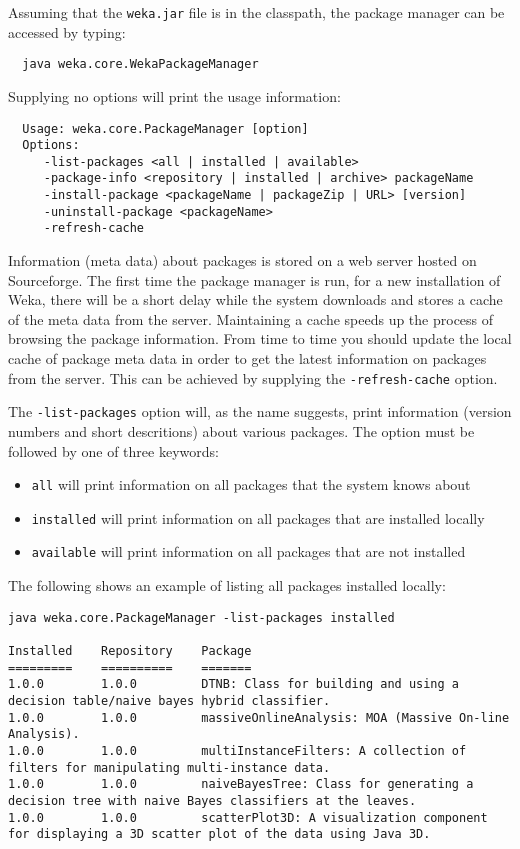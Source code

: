 Assuming that the \texttt{weka.jar} file is in the classpath, the
package manager can be accessed by typing:

{\scriptsize
\begin{verbatim}
  java weka.core.WekaPackageManager
\end{verbatim}}

Supplying no options will print the usage information:

{\scriptsize
\begin{verbatim}
  Usage: weka.core.PackageManager [option]
  Options:
     -list-packages <all | installed | available>
     -package-info <repository | installed | archive> packageName
     -install-package <packageName | packageZip | URL> [version]
     -uninstall-package <packageName>
     -refresh-cache
\end{verbatim}}

Information (meta data) about packages is stored on a web server
hosted on Sourceforge. The first time the package manager is run, for
a new installation of Weka, there will be a short delay while the
system downloads and stores a cache of the meta data from the
server. Maintaining a cache speeds up the process of browsing
the package information. From time to time you should update the
local cache of package meta data in order to get the latest information
on packages from the server. This can be achieved by supplying the
\texttt{-refresh-cache} option.

The \texttt{-list-packages} option will, as the name suggests, print
information (version numbers and short descritions) about various
packages. The option must be followed by one of three keywords:

\begin{itemize}
\item \texttt{all} will print information on all packages that the system knows about
\item \texttt{installed} will print information on all packages that are installed locally
\item \texttt{available} will print information on all packages that are not installed
\end{itemize}

The following shows an example of listing all packages installed locally:

{\scriptsize
\begin{verbatim}
java weka.core.PackageManager -list-packages installed

Installed    Repository    Package
=========    ==========    =======
1.0.0        1.0.0         DTNB: Class for building and using a decision table/naive bayes hybrid classifier.
1.0.0        1.0.0         massiveOnlineAnalysis: MOA (Massive On-line Analysis).
1.0.0        1.0.0         multiInstanceFilters: A collection of filters for manipulating multi-instance data.
1.0.0        1.0.0         naiveBayesTree: Class for generating a decision tree with naive Bayes classifiers at the leaves.
1.0.0        1.0.0         scatterPlot3D: A visualization component for displaying a 3D scatter plot of the data using Java 3D.
\end{verbatim}}

